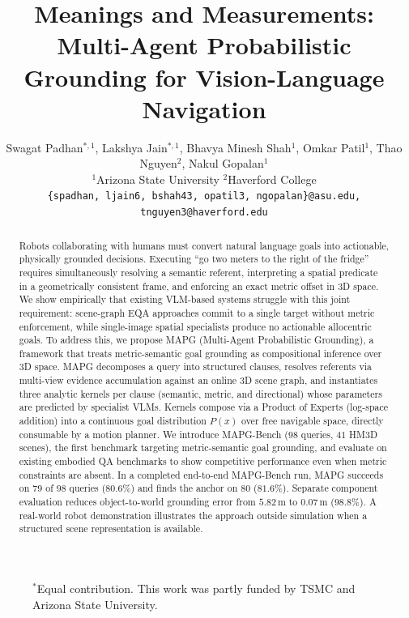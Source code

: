 \documentclass[letterpaper, 10 pt, conference]{ieeeconf}  %
\title{\LARGE \bf
Meanings and Measurements: Multi-Agent Probabilistic Grounding for Vision-Language Navigation
}
\author{
\begin{tabular}{c}
Swagat Padhan$^{*,1}$, Lakshya Jain$^{*,1}$, Bhavya Minesh Shah$^{1}$, Omkar Patil$^{1}$, Thao Nguyen$^{2}$, Nakul Gopalan$^{1}$ \\[4pt]
$^{1}$Arizona State University \qquad $^{2}$Haverford College \\[2pt]
{\footnotesize \texttt{\{spadhan, ljain6, bshah43, opatil3, ngopalan\}@asu.edu, tnguyen3@haverford.edu}}
\end{tabular}
}
\newif\ifcomments
\newif\ifrevhl
\newcommand{\rev}[1]{\ifrevhl\textcolor{BrickRed}{#1}\else#1\fi}
\newcommand{\opnote}[1]{\ifcomments\textcolor{blue}{#1}\fi}
\begin{document}
\maketitle
\begin{figure}[b]
\vspace{-10pt}
\begin{tcolorbox}[
  colback=white,
  colframe=black,
  boxrule=0.3pt,
  arc=0pt,
  left=4pt, right=4pt, top=3pt, bottom=3pt,
  fontupper=\footnotesize
]
$^{*}$Equal contribution. This work was partly funded by TSMC and Arizona State University.
\end{tcolorbox}
\end{figure}
\thispagestyle{empty}
\pagestyle{empty}


\begin{abstract}

\rev{Robots collaborating with humans must convert natural language goals into actionable, physically grounded decisions. Executing ``go two meters to the right of the fridge'' requires simultaneously resolving a semantic referent, interpreting a spatial predicate in a geometrically consistent frame, and enforcing an exact metric offset in $3$D space. We show empirically that existing VLM-based systems struggle with this joint requirement: scene-graph EQA approaches commit to a single target without metric enforcement, while single-image spatial specialists produce no actionable allocentric goals. To address this, we propose MAPG (Multi-Agent Probabilistic Grounding), a framework that treats metric-semantic goal grounding as compositional inference over $3$D space. MAPG decomposes a query into structured clauses, resolves referents via multi-view evidence accumulation against an online $3$D scene graph, and instantiates three analytic kernels per clause (semantic, metric, and directional) whose parameters are predicted by specialist VLMs. Kernels compose via a Product of Experts (log-space addition) into a continuous goal distribution $P(x)$ over free navigable space, directly consumable by a motion planner.} 
We introduce MAPG-Bench ($98$ queries, $41$ HM$3$D scenes), the first benchmark targeting metric-semantic goal grounding, and evaluate on existing embodied QA benchmarks to show competitive performance even when metric constraints are absent. In a completed end-to-end MAPG-Bench run, MAPG succeeds on $79$ of $98$ queries ($80.6\%$) and finds the anchor on $80$ ($81.6\%$). Separate component evaluation reduces object-to-world grounding error from $5.82\,\mathrm{m}$ to $0.07\,\mathrm{m}$ ($98.8\%$). %
A real-world robot demonstration illustrates the approach outside simulation when a structured scene representation is available.
\end{abstract}













\end{document}
